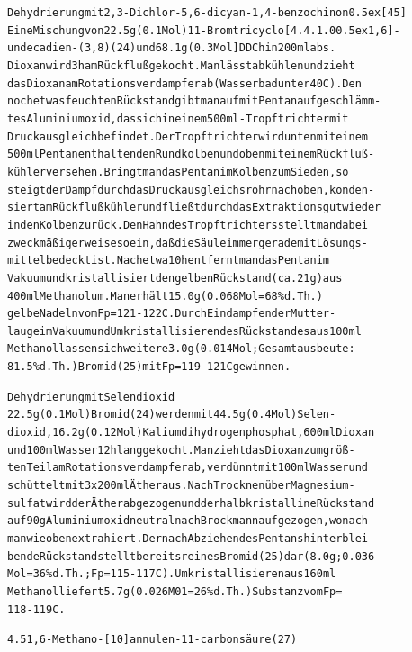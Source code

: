 \documentclass[a4paper,11pt]{article}
\begin{document}
\begin{alltt}
Dehydrierung mit 2,3-Dichlor-5,6-dicyan-1,4-benzochinon \raise0.5ex\hbox{[45]}
Eine Mischung von 22.5 g (0.1 Mol) 11-Bromtricyclo[4.4.1.0\raise0.5ex\hbox{1,6}]-
undecadien-(3,8) (24) und 68.1 g (0.3 Mol] DDCh in 200 ml abs.
Dioxan wird 3 h am Rückfluß gekocht. Man lässt abkühlen und zieht
das Dioxan am Rotationsverdampfer ab (Wasserbad unter 40\degree{}C). Den
noch etwas feuchten Rückstand gibt man auf mit Pentan aufgeschlämm-
tes Aluminiumoxid, das sich in einem 500 ml - Tropftrichter mit
Druckausgleich befindet. Der Tropftrichter wird unten mit einem
500 ml Pentan enthaltenden Rundkolben und oben mit einem Rückfluß-
kühler versehen. Bringt man das Pentan im Kolben zum Sieden, so
steigt der Dampf durch das Druckausgleichsrohr nach oben, konden-
siert am Rückflußkühler und fließt durch das Extraktionsgut wieder
in den Kolben zurück. Den Hahn des Tropftrichters stellt man dabei
zweckmäßigerweise so ein, daß die Säule immer gerade mit Lösungs-
mittel bedeckt ist. Nach etwa 10 h entfernt man das Pentan im
Vakuum und kristallisiert den gelben Rückstand (ca. 21 g) aus
400 ml Methanol um. Man erhält 15.0 g (0.068 Mol = 68 \% d.Th.)
gelbe Nadeln vom Fp = 121 - 122\degree{}C. Durch Eindampfen der Mutter-
lauge im Vakuum und Umkristallisieren des Rückstandes aus 100 ml
Methanol lassen sich weitere 3.0 g (0.014 Mol; Gesamtausbeute:
81.5 \% d.Th.) Bromid (25) mit Fp = 119 - 121\degree{}C gewinnen.

\newpage
{}


Dehydrierung mit Selendioxid
22.5 g (0.1 Mol) Bromid (24) werden mit 44.5 g (0.4 Mol) Selen-
dioxid, 16.2 g (0.12 Mol) Kaliumdihydrogenphosphat, 600 ml Dioxan
und 100 ml Wasser 12 h lang gekocht. Man zieht das Dioxan zum größ-
ten Teil am Rotationsverdampfer ab, verdünnt mit 100 ml Wasser und
schüttelt mit 3 x 200 ml Äther aus. Nach Trocknen über Magnesium-
sulfat wird der Äther abgezogen und der halbkristalline Rückstand
auf 90 g Aluminiumoxid neutral nach Brockmann aufgezogen, wonach
man wie oben extrahiert. Der nach Abziehen des Pentans hinterblei-
bende Rückstand stellt bereits reines Bromid (25) dar (8.0 g; 0.036
Mol = 36 \% d.Th.; Fp = 115 -117\degree{}C). Umkristallisieren aus 160 ml
Methanol liefert 5.7 g (0.026 M01 = 26 \% d.Th.) Substanz vom Fp =
118 - 119\degree{}C.


4.5 1,6-Methano-[10]annulen-11-carbonsäure (27)


\end{alltt}
\end{document}
